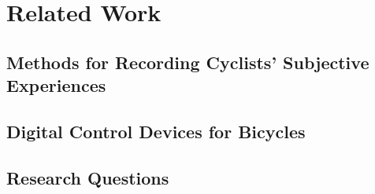 \section{Related Work}\label{sec:related_work}

\subsection{Methods for Recording Cyclists' Subjective Experiences}

\cite{cycling_subjective_experience}

\subsection{Digital Control Devices for Bicycles}

\cite{brotate_and_tribike}

\subsection{Research Questions}
